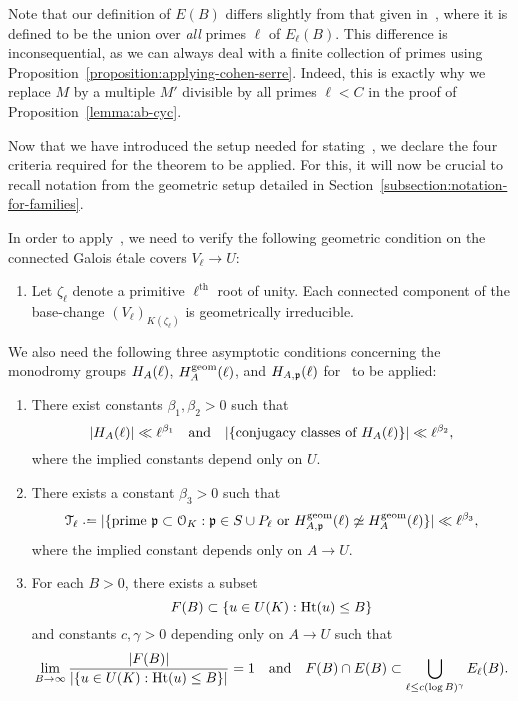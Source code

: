 \begin{remark}\label{thanksdavide}
Note that our definition of $E(B)$ differs slightly from that given in~\cite[Theorem 1.1]{scoopdedoo}, where it is defined to be the union over \emph{all} primes $\ell$ of $E_{\ell}(B)$. This difference is inconsequential, as we can always deal with a finite collection of primes using Proposition~\ref{proposition:applying-cohen-serre}. Indeed, this is exactly why we replace $M$ by a multiple $M'$ divisible by all primes $\ell < C$ in the proof of Proposition~\ref{lemma:ab-cyc}.
\end{remark}

Now that we have introduced the setup needed for stating~\cite[Theorem 3.9]{scoopdedoo}, we declare the four criteria required for the theorem to be applied. For this, it will now be crucial to recall notation from the geometric setup detailed in Section~\ref{subsection:notation-for-families}.
\begin{condition} \label{definition:assumptions}
In order to apply~\cite[Theorem 3.9]{scoopdedoo}, we need to verify the following geometric condition on the connected Galois \'{e}tale covers $V_\ell \to U$:
\begin{enumerate}
	\item[\customlabel{assumption-4}{(G)}] Let $\zeta_\ell$ denote a primitive $\ell^{\mathrm{th}}$ root of unity. Each connected component of the base-change $(V_{\ell})_{K(\zeta_\ell)}$ is geometrically irreducible.
\end{enumerate}
We also need the following three asymptotic conditions concerning the monodromy groups $H_A(\ell)$, $H_A^{\operatorname{geom}}(\ell)$, and $H_{A, \mathfrak p}(\ell)$ for~\cite[Theorem 3.9]{scoopdedoo} to be applied:
	\begin{enumerate}
		\item[\customlabel{property-a1}{(A1)}] There exist constants $\beta_1, \beta_2 > 0$ such that
		\[
			| H_A(\ell) | \ll \ell^{\beta_1} \quad \text{and} \quad | \{\text{conjugacy classes of } H_A(\ell) \} | \ll \ell^{\beta_2},
		\]
        where the implied constants depend only on $U$.
		\item[\customlabel{property-a2}{(A2)}] There exists a constant $\beta_3 > 0$ such that
		\[
			\geometricprimes \ell \defeq |\{ \text{prime } \mf{p} \subset \OO_K : \mf{p} \in S \cup P_\ell \text{ or } \mono_{A, \pp}^{\on{geom}}(\ell) \not\simeq \mono_A^{\on{geom}}(\ell) \} | \ll \ell^{\beta_3},
		\]
        where the implied constant depends only on $A \rightarrow U$.
		\item[\customlabel{property-a3}{(A3)}] For each $B > 0$, there exists a subset
		\[
			F(B) \subset \{u \in U(K) : \operatorname{Ht}(u) \le B\}
		\]
		and constants $c, \gamma > 0$ depending only on $A \rightarrow U$ such that
		\begin{align*}
		\lim_{B \to \infty} \frac{|F(B)|}{|\{u \in U(K) : \operatorname{Ht}(u) \le B\}|} = 1	\quad \text{and} \quad F(B) \cap E(B) \subset \bigcup_{\ell \le c (\log B)^\gamma} E_{ \ell}(B).
		\end{align*}
	\end{enumerate}
\end{condition}

